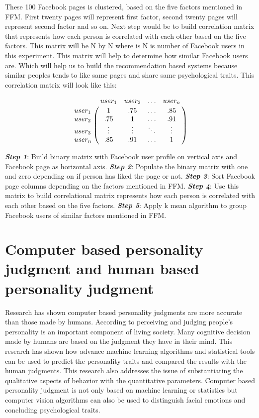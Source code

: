 \documentclass[sigconf]{acmart}
\begin{document}
These 100 Facebook pages is clustered, based on the five factors mentioned in FFM. First twenty pages will represent first factor, second twenty pages will represent second factor and so on. Next step would be to build correlation matrix that represents how each person is correlated with each other based on the five factors. This matrix will be N by N where is N is number of Facebook users in this experiment. This matrix will help to determine how similar Facebook users are. Which will help us to build the recommendation based systems because similar peoples tends to like same pages and share same psychological traits. This correlation matrix will look like this:

$$\bordermatrix{\text{}&user_1 &user_2&\ldots &user_n\cr
                user_1&1 &  .75  & \ldots & .85\cr
                user_2& .75  &  1 & \ldots & .91\cr
                user_3& \vdots & \vdots & \ddots & \vdots\cr
                user_n& .85  &   .91       &\ldots & 1}$$               
                

\begin{algorithm}


\textbf{\textit{Step 1}}: Build binary matrix with Facebook user profile on vertical axis and Facebook page as horizontal axis.\newline
\textbf{\textit{Step 2}}: Populate the binary matrix with one and zero depending on if person has liked the page or not.\newline
\textbf{\textit{Step 3}}: Sort Facebook page columns depending on the factors mentioned in FFM.\newline 
\textbf{\textit{Step 4}}: Use this matrix to build correlational matrix represents how each person is correlated with each other based on the five factors.\newline
\textbf{\textit{Step 5}}: Apply k mean algorithm to group Facebook users of similar factors mentioned in FFM. 

\end{algorithm}

\section{Computer based personality judgment and human based personality judgment}
 Research \cite{ref12} has shown computer based personality judgments are more accurate than those made by humans. According to \cite{ref12}  perceiving and judging people’s personality is an important component of living society. Many cognitive decision made by humans are based on the judgment they have in their mind. This research \cite{ref12} has shown how advance machine learning algorithms and statistical tools can be used to predict the personality traits and compared the results with the human judgments. This research also addresses the issue of substantiating the qualitative aspects of behavior with the quantitative parameters. Computer based personality judgment is not only based on machine learning or statistics but computer vision algorithms can also be used to distinguish facial emotions and concluding psychological traits. 
 
\end{document}
